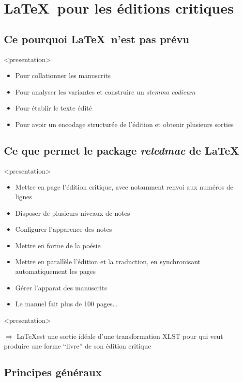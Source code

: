 \documentclass[transnotheorems,noamsthm]{beamer}
\newenvironment{slide}{%
  \begin{frame}
  <presentation>\mode<presentation>{\frametitle{\insertsubsection}}%
  }%
  {\end{frame}}
\begin{document}
\section{\LaTeX\ pour les éditions critiques}
\subsection{Ce pourquoi \LaTeX\ n'est pas prévu}

\begin{slide}
  \begin{itemize}
    \item Pour collationner les manuscrits
    \item Pour analyser les variantes et construire un \emph{stemma codicum}
    \item Pour établir le texte édité
    \item Pour avoir un encodage structurée de l'édition et obtenir plusieurs sorties
  \end{itemize}
\end{slide}
\subsection{Ce que permet le package \emph{reledmac} de \LaTeX}

\begin{slide}
  \begin{itemize}
    \item Mettre en page l'édition critique, avec notamment renvoi aux numéros de lignes
    \item Disposer de plusieurs niveaux de notes
    \item Configurer l'apparence des notes
    \item Mettre en forme de la poésie
    \item Mettre en parallèle l'édition et la traduction, en synchronisant automatiquement les pages
    \item Gérer l'apparat des manuscrits
    \item Le manuel fait plus de 100 pages\ldots
  \end{itemize}
\end{slide}

\begin{slide}
  \alert{$\Longrightarrow$}  \LaTeX est une sortie idéale d'une transformation XLST pour qui veut produire une forme \enquote{livre} de son édition critique
\end{slide}
\subsection{Principes généraux}
\end{document}
